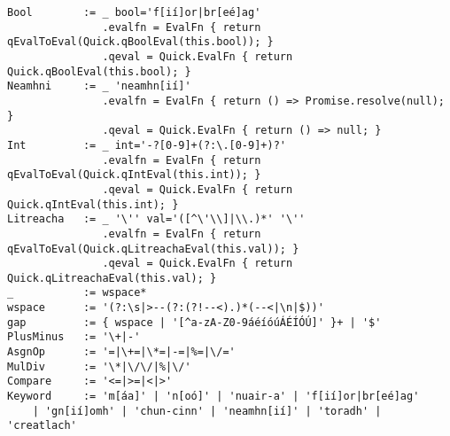 \begin{lstlisting}[language=tspeg, frame=single]
Bool        := _ bool='f[ií]or|br[eé]ag'
               .evalfn = EvalFn { return qEvalToEval(Quick.qBoolEval(this.bool)); }
               .qeval = Quick.EvalFn { return Quick.qBoolEval(this.bool); }
Neamhni     := _ 'neamhn[ií]'
               .evalfn = EvalFn { return () => Promise.resolve(null); }
               .qeval = Quick.EvalFn { return () => null; }
Int         := _ int='-?[0-9]+(?:\.[0-9]+)?'
               .evalfn = EvalFn { return qEvalToEval(Quick.qIntEval(this.int)); }
               .qeval = Quick.EvalFn { return Quick.qIntEval(this.int); }
Litreacha   := _ '\'' val='([^\'\\]|\\.)*' '\''
               .evalfn = EvalFn { return qEvalToEval(Quick.qLitreachaEval(this.val)); }
               .qeval = Quick.EvalFn { return Quick.qLitreachaEval(this.val); }
_           := wspace*
wspace      := '(?:\s|>--(?:(?!--<).)*(--<|\n|$))'
gap         := { wspace | '[^a-zA-Z0-9áéíóúÁÉÍÓÚ]' }+ | '$'
PlusMinus   := '\+|-'
AsgnOp      := '=|\+=|\*=|-=|%=|\/='
MulDiv      := '\*|\/\/|%|\/'
Compare     := '<=|>=|<|>'
Keyword     := 'm[áa]' | 'n[oó]' | 'nuair-a' | 'f[ií]or|br[eé]ag'
    | 'gn[ií]omh' | 'chun-cinn' | 'neamhn[ií]' | 'toradh' | 'creatlach'
\end{lstlisting}
